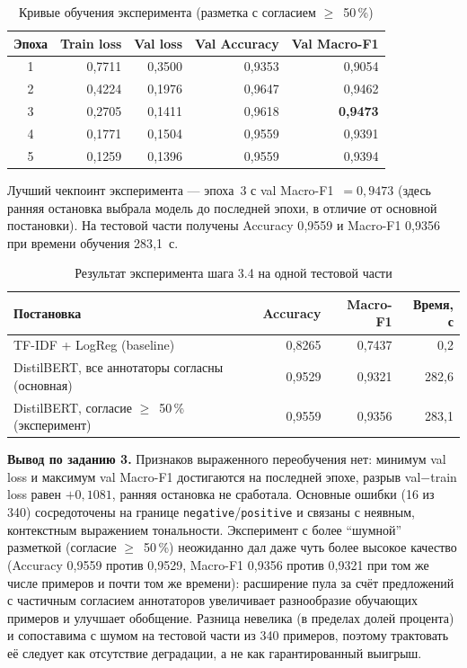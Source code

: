 \documentclass[14pt,a4paper]{extarticle}
\begin{document}
\begin{table}[H]
    \centering
    \begin{tabular}{crrrr}
        \toprule
        Эпоха & Train loss & Val loss & Val Accuracy & Val Macro-F1 \\
        \midrule
        1 & 0{,}7711 & 0{,}3500 & 0{,}9353 & 0{,}9054 \\
        2 & 0{,}4224 & 0{,}1976 & 0{,}9647 & 0{,}9462 \\
        3 & 0{,}2705 & 0{,}1411 & 0{,}9618 & \textbf{0{,}9473} \\
        4 & 0{,}1771 & 0{,}1504 & 0{,}9559 & 0{,}9391 \\
        5 & 0{,}1259 & 0{,}1396 & 0{,}9559 & 0{,}9394 \\
        \bottomrule
    \end{tabular}
    \caption{Кривые обучения эксперимента (разметка с согласием $\ge$~50\,\%)}
    \label{tab:exp}
\end{table}

Лучший чекпоинт эксперимента --- эпоха~3 с val Macro-F1~$=0{,}9473$ (здесь ранняя
остановка выбрала модель до последней эпохи, в отличие от основной постановки). На
тестовой части получены Accuracy 0{,}9559 и Macro-F1 0{,}9356 при времени обучения
283{,}1~с.

\begin{table}[H]
    \centering
    \begin{tabular}{lrrr}
        \toprule
        Постановка & Accuracy & Macro-F1 & Время, с \\
        \midrule
        TF-IDF + LogReg (baseline)                        & 0{,}8265 & 0{,}7437 & 0{,}2 \\
        DistilBERT, все аннотаторы согласны (основная)    & 0{,}9529 & 0{,}9321 & 282{,}6 \\
        DistilBERT, согласие $\ge$~50\,\% (эксперимент)   & 0{,}9559 & 0{,}9356 & 283{,}1 \\
        \bottomrule
    \end{tabular}
    \caption{Результат эксперимента шага 3.4 на одной тестовой части}
    \label{tab:final}
\end{table}

\noindent\textbf{Вывод по заданию 3.} Признаков выраженного переобучения нет:
минимум val loss и максимум val Macro-F1 достигаются на последней эпохе, разрыв
val$-$train loss равен $+0{,}1081$, ранняя остановка не сработала. Основные ошибки
(16 из 340) сосредоточены на границе \texttt{negative}/\texttt{positive} и связаны
с неявным, контекстным выражением тональности. Эксперимент с более ``шумной''
разметкой (согласие $\ge$~50\,\%) неожиданно дал даже чуть более высокое качество
(Accuracy 0{,}9559 против 0{,}9529, Macro-F1 0{,}9356 против 0{,}9321 при том же
числе примеров и почти том же времени): расширение пула за счёт предложений с
частичным согласием аннотаторов увеличивает разнообразие обучающих примеров и
улучшает обобщение. Разница невелика (в пределах долей процента) и сопоставима с
шумом на тестовой части из 340 примеров, поэтому трактовать её следует как
отсутствие деградации, а не как гарантированный выигрыш.
\end{document}
